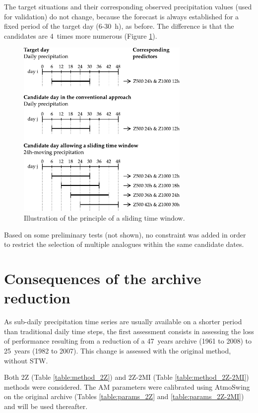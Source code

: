 \documentclass[hess]{copernicus}
\begin{document}
The target situations and their corresponding observed precipitation values (used for validation) do not change, because the forecast is always established for a fixed period of the target day (6-30~h), as before. The difference is that the candidates are 4~times more numerous (Figure \ref{fig:principle}).

\begin{figure}[htb]
	\begin{center}
		\includegraphics[width=8.3cm]{figures/illustration_moving_window.pdf}
	\end{center}
	\caption{Illustration of the principle of a sliding time window. }
	\label{fig:principle}
\end{figure}

Based on some preliminary tests (not shown), no constraint was added in order to restrict the selection of multiple analogues within the same candidate dates.


\section{Consequences of the archive reduction}

As sub-daily precipitation time series are usually available on a shorter period than traditional daily time steps, the first assessment consists in assessing the loss of performance resulting from a reduction of a 47~years archive (1961 to 2008) to 25~years (1982 to 2007). This change is assessed with the original method, without STW.

Both 2Z (Table \ref{table:method_2Z}) and 2Z-2MI (Table \ref{table:method_2Z-2MI}) methods were considered. The AM parameters were calibrated using AtmoSwing \citep{Horton2016} on the original archive (Tables \ref{table:params_2Z} and \ref{table:params_2Z-2MI}) and will be used thereafter.
\end{document}
